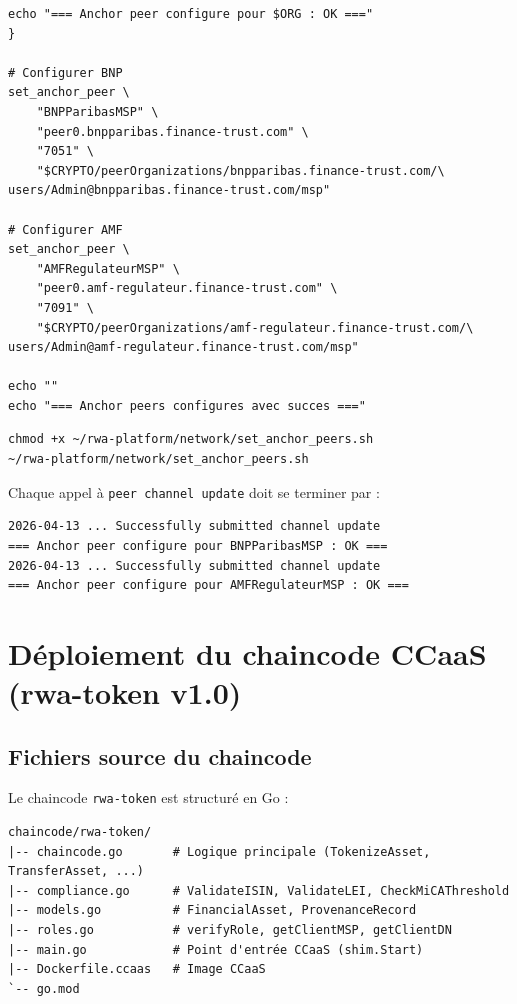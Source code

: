 \documentclass[12pt,a4paper,french]{article}
\begin{document}
\begin{lstlisting}[style=bash, caption={Script set\_anchor\_peers.sh}]
    echo "=== Anchor peer configure pour $ORG : OK ==="
}

# Configurer BNP
set_anchor_peer \
    "BNPParibasMSP" \
    "peer0.bnpparibas.finance-trust.com" \
    "7051" \
    "$CRYPTO/peerOrganizations/bnpparibas.finance-trust.com/\
users/Admin@bnpparibas.finance-trust.com/msp"

# Configurer AMF
set_anchor_peer \
    "AMFRegulateurMSP" \
    "peer0.amf-regulateur.finance-trust.com" \
    "7091" \
    "$CRYPTO/peerOrganizations/amf-regulateur.finance-trust.com/\
users/Admin@amf-regulateur.finance-trust.com/msp"

echo ""
echo "=== Anchor peers configures avec succes ==="
\end{lstlisting}

\begin{lstlisting}[style=bash, caption={Exécuter le script}]
chmod +x ~/rwa-platform/network/set_anchor_peers.sh
~/rwa-platform/network/set_anchor_peers.sh
\end{lstlisting}

\begin{successbox}
Chaque appel à \texttt{peer channel update} doit se terminer par :
\begin{verbatim}
2026-04-13 ... Successfully submitted channel update
=== Anchor peer configure pour BNPParibasMSP : OK ===
2026-04-13 ... Successfully submitted channel update
=== Anchor peer configure pour AMFRegulateurMSP : OK ===
\end{verbatim}
\end{successbox}

\section{Déploiement du chaincode CCaaS (rwa-token v1.0)}

\subsection{Fichiers source du chaincode}

Le chaincode \texttt{rwa-token} est structuré en Go :

\begin{lstlisting}[style=bash, caption={Structure du chaincode}]
chaincode/rwa-token/
|-- chaincode.go       # Logique principale (TokenizeAsset, TransferAsset, ...)
|-- compliance.go      # ValidateISIN, ValidateLEI, CheckMiCAThreshold
|-- models.go          # FinancialAsset, ProvenanceRecord
|-- roles.go           # verifyRole, getClientMSP, getClientDN
|-- main.go            # Point d'entrée CCaaS (shim.Start)
|-- Dockerfile.ccaas   # Image CCaaS
`-- go.mod
\end{lstlisting}
\end{document}
